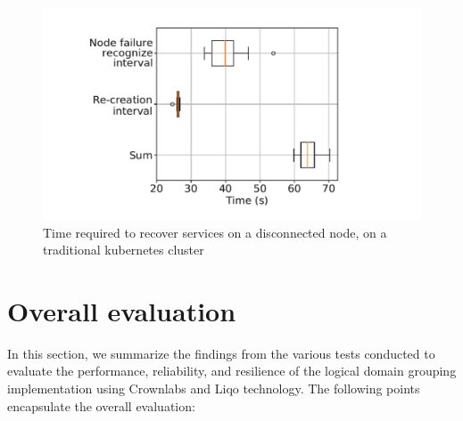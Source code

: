 \begin{figure}[ht]\centering
\includegraphics[scale=0.5]{Pictures/seba}
\caption{Time required to recover services on a disconnected node, on a traditional kubernetes cluster}\label{fig:seba}
\end{figure}

\section{Overall evaluation}
In this section, we summarize the findings from the various tests conducted to evaluate the performance, reliability, and resilience of the logical domain grouping implementation using Crownlabs and Liqo technology. The following points encapsulate the overall evaluation:

